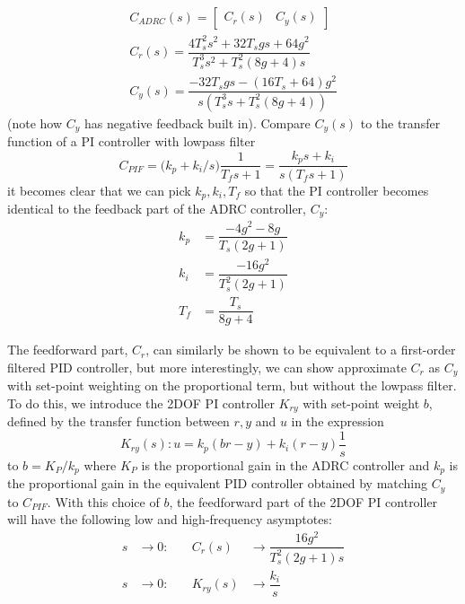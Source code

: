\documentclass[letterpaper, 10 pt, conference]{ieeeconf}
\newcommand{\bmatrixx}[1]{\begin{bmatrix}#1\end{bmatrix}}
\begin{document}



\begin{align}
	C_{ADRC}(s) = \bmatrixx{C_r(s) & C_y(s)}\\
	C_r(s) = \dfrac{4T_{s}^2s^2 + 32T_{s}gs + 64g^2}{T_{s}^3s^2 + T_{s}^2(8g + 4)s} \\
	C_y(s) = \dfrac{- 32T_{s}gs -(16T_{s} + 64)g^2}{s(T_{s}^3s + T_{s}^2(8g + 4))}
\end{align}
(note how $C_y$ has negative feedback built in). Compare $C_y(s)$ to the transfer function of a PI controller with lowpass filter
$$C_{PIF} = \big(k_p + k_i/s \big)\dfrac{1}{T_f s + 1} = \dfrac{k_p s + k_i}{s(T_f s + 1)}$$
it becomes clear that we can pick $k_p, k_i, T_f$ so that the PI controller becomes identical to the feedback part of the ADRC controller, $C_y$:
\begin{align}
	k_p &= \dfrac{-4 g^2 - 8 g}{T_s(2 g + 1)} \label{eq:kp}\\
	k_i &= \dfrac{-16 g^2}{T_s^2(2g + 1)} \label{eq:ki}\\
	T_f &= \dfrac{T_s}{8 g + 4} \label{eq:Tf}
\end{align}



The feedforward part, $C_r$, can similarly be shown to be equivalent to a first-order filtered PID controller, but more interestingly, we can show approximate $C_r$ as $C_y$ with set-point weighting on the proportional term, but without the lowpass filter. To do this, we introduce the 2DOF PI controller $K_{ry}$ with set-point weight $b$, defined by the transfer function between $r,y$ and $u$ in the expression
$$K_{ry}(s) : u = k_p (br - y) + k_i(r-y)\frac{1}{s}$$
to $b = K_P / k_p$ where $K_P$ is the proportional gain in the ADRC controller and $k_p$ is the proportional gain in the equivalent PID controller obtained by matching $C_y$ to $C_{PIF}$. With this choice of $b$, the feedforward part of the 2DOF PI controller will have the following low and high-frequency asymptotes:
\begin{align}
	s &\to 0:  & \quad C_r(s) &\to \dfrac{16g^2}{T_{s}^2(2g + 1)s} \\
	s &\to 0:  & \quad K_{ry}(s) &\to \dfrac{k_i}{s} 
\end{align}
\end{document}
